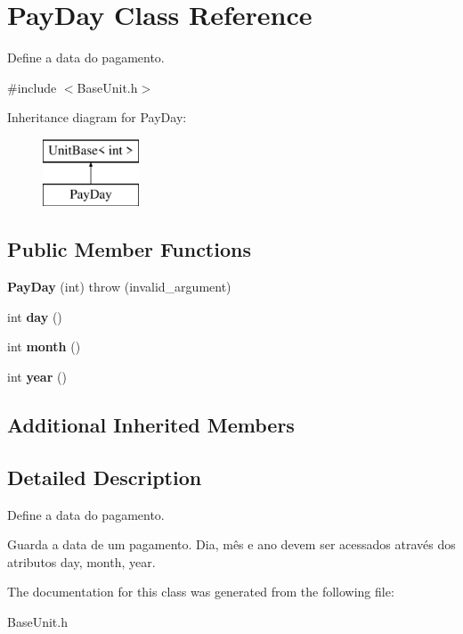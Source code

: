 \hypertarget{classPayDay}{\section{Pay\-Day Class Reference}
\label{classPayDay}
}


Define a data do pagamento.  




{\ttfamily \#include $<$Base\-Unit.\-h$>$}

Inheritance diagram for Pay\-Day\-:\begin{figure}[H]
\begin{center}
\leavevmode
\includegraphics[height=2.000000cm]{classPayDay}
\end{center}
\end{figure}
\subsection*{Public Member Functions}
\begin{DoxyCompactItemize}
\item 
\hypertarget{classPayDay_a8b78191ec9a71a44086a2ca6a54a2303}{{\bfseries Pay\-Day} (int)  throw (invalid\-\_\-argument)}\label{classPayDay_a8b78191ec9a71a44086a2ca6a54a2303}

\item 
\hypertarget{classPayDay_a297ce892f49aa9f3a504d514f171ed1d}{int {\bfseries day} ()}\label{classPayDay_a297ce892f49aa9f3a504d514f171ed1d}

\item 
\hypertarget{classPayDay_ada65e8834c142a95cd35ca2b399fbcde}{int {\bfseries month} ()}\label{classPayDay_ada65e8834c142a95cd35ca2b399fbcde}

\item 
\hypertarget{classPayDay_a962960925f9e6eaaac0fef5eb96849ec}{int {\bfseries year} ()}\label{classPayDay_a962960925f9e6eaaac0fef5eb96849ec}

\end{DoxyCompactItemize}
\subsection*{Additional Inherited Members}


\subsection{Detailed Description}
Define a data do pagamento. 

Guarda a data de um pagamento. Dia, mês e ano devem ser acessados através dos atributos day, month, year. 

The documentation for this class was generated from the following file\-:\begin{DoxyCompactItemize}
\item 
Base\-Unit.\-h\end{DoxyCompactItemize}
